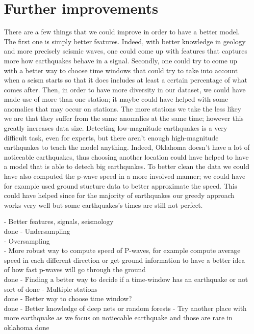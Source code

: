 \documentclass[10pt,conference,compsocconf]{IEEEtran}
\begin{document}
\section{Further improvements}
There are a few things that we could improve in order to have a better model. The first one is simply better features. Indeed, with better knowledge in geology and more precisely seismic waves, one could come up with features that captures more how earthquakes behave in a signal. Secondly, one could try to come up with a better way to choose time windows that could try to take into account when a seism starts so that it does includes at least a certain percentage of what comes after. Then, in order to have more diversity in our dataset, we could have made use of more than one station; it maybe could have helped with some anomalies that may occur on stations. The more stations we take the less likey we are that they suffer from the same anomalies at the same time; however this greatly increases data size. Detecting low-magnitude earthquakes is a very difficult task, even for experts, but there aren't enough high-magnitude earthquakes to teach the model anything. Indeed, Oklahoma doesn't have a lot of noticeable earthquakes, thus choosing another location could have helped to have a model that is able to detech big earthquakes. To better clean the data we could have also computed the p-wave speed in a more involved manner; we could have for example used ground stucture data to better approximate the speed. This could have helped since for the majority of earthquakes our greedy approach works very well but some earthquakes's times are still not perfect.

- Better features, signals, seismology\\ done
- Undersampling\\
- Oversampling\\
- More robust way to compute speed of P-waves, for example compute average speed in each different direction or get ground information to have a better idea of how fast p-waves will go through the ground\\ done
- Finding a better way to decide if a time-window has an earthquake or not\\ sort of done
- Multiple stations\\ done
- Better way to choose time window?\\ done
- Better knowledge of deep nets or random forests
- Try another place with more earthquake as we focus on notiecable earthquake and those are rare in oklahoma done
\end{document}
